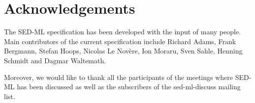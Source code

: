 \chapter{Acknowledgements}
\label{sec:acknowledgments}
The SED-ML specification has been developed with the input of many people. Main contributors of the current specification include Richard Adams, Frank Bergmann, Stefan Hoops, Nicolas Le Nov\`ere, Ion Moraru, Sven Sahle, Henning Schmidt and  Dagmar Waltemath.

Moreover, we would like to thank all the participants of the meetings where SED-ML has been discussed as well as the subscribers of the sed-ml-discuss mailing list.

